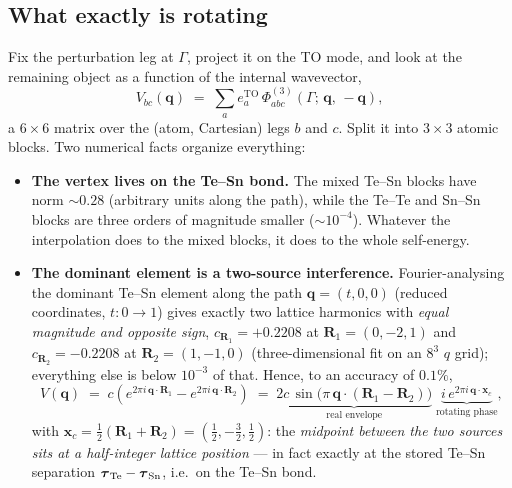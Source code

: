 \documentclass[11pt,a4paper]{article}
\newcommand{\qv}{\mathbf{q}}
\begin{document}
\subsection{What exactly is rotating}
\label{sec:topo-what}

Fix the perturbation leg at $\Gamma$, project it on the TO mode, and
look at the remaining object as a function of the internal wavevector,
\begin{equation}
  V_{bc}(\qv) \;=\; \sum_a e^{\mathrm{TO}}_a\,
  \Phi^{(3)}_{abc}(\Gamma;\, \qv,\, -\qv),
  \label{eq:Vdef}
\end{equation}
a $6\times6$ matrix over the (atom, Cartesian) legs $b$ and $c$.  Split
it into $3\times3$ atomic blocks.  Two numerical facts organize
everything:

\begin{itemize}
\item \textbf{The vertex lives on the Te--Sn bond.}  The mixed Te--Sn
  blocks have norm $\sim0.28$ (arbitrary units along the path), while
  the Te--Te and Sn--Sn blocks are three orders of magnitude smaller
  ($\sim10^{-4}$).  Whatever the interpolation does to the mixed blocks,
  it does to the whole self-energy.
\item \textbf{The dominant element is a two-source interference.}
  Fourier-analysing the dominant Te--Sn element along the path
  $\qv=(t,0,0)$ (reduced coordinates, $t:0\to1$) gives exactly two
  lattice harmonics with \emph{equal magnitude and opposite sign},
  $c_{\mathbf R_1}=+0.2208$ at $\mathbf R_1=(0,-2,1)$ and
  $c_{\mathbf R_2}=-0.2208$ at $\mathbf R_2=(1,-1,0)$ (three-dimensional
  fit on an $8^3$ $q$ grid); everything else is below $10^{-3}$ of
  that.  Hence, to an accuracy of $0.1\%$,
  \begin{equation}
    V(\qv) \;=\; c\left(e^{2\pi i\,\qv\cdot\mathbf R_1}
    - e^{2\pi i\,\qv\cdot\mathbf R_2}\right)
    \;=\; \underbrace{2c\,\sin\!\big(\pi\,\qv\cdot(\mathbf R_1-\mathbf
    R_2)\big)}_{\text{real envelope}}\;
    \underbrace{i\,e^{2\pi i\,\qv\cdot\mathbf x_c}}_{\text{rotating
    phase}},
    \label{eq:sshform}
  \end{equation}
  with $\mathbf x_c=\tfrac12(\mathbf R_1+\mathbf R_2)
  = (\tfrac12,-\tfrac32,\tfrac12)$: the \emph{midpoint between the two
  sources sits at a half-integer lattice position} --- in fact exactly
  at the stored Te--Sn separation
  $\boldsymbol\tau_{\rm Te}-\boldsymbol\tau_{\rm Sn}$, i.e.\ on the
  Te--Sn bond.
\end{itemize}
\end{document}
